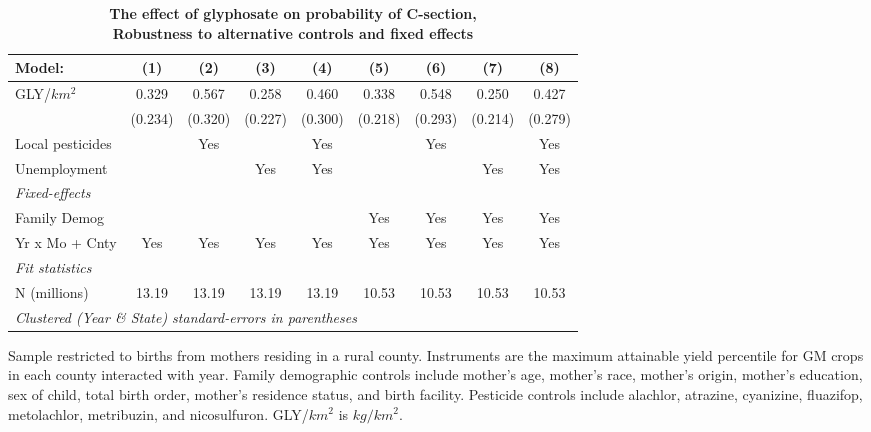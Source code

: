 \begin{table}[htbp]
   \centering
   \small
   \begin{threeparttable}[b]
      \caption{\label{tab:robust-cntrl-c_section-allyielddiffpercentilegmomax} \textbf{The effect of glyphosate on probability of C-section, \\ Robustness to alternative controls and fixed effects}}
      \begin{tabular}{lcccccccc}
         \toprule
         Model:           & (1)     & (2)     & (3)     & (4)     & (5)     & (6)     & (7)     & (8)\\  
         \midrule 
         GLY/$km^2$       & 0.329   & 0.567   & 0.258   & 0.460   & 0.338   & 0.548   & 0.250   & 0.427\\   
                          & (0.234) & (0.320) & (0.227) & (0.300) & (0.218) & (0.293) & (0.214) & (0.279)\\   
         Local pesticides &         & Yes     &         & Yes     &         & Yes     &         & Yes\\  
         Unemployment     &         &         & Yes     & Yes     &         &         & Yes     & Yes\\  
         \midrule
         \emph{Fixed-effects}\\
         Family Demog     &         &         &         &         & Yes     & Yes     & Yes     & Yes\\  
         Yr x Mo + Cnty   & Yes     & Yes     & Yes     & Yes     & Yes     & Yes     & Yes     & Yes\\  
         \midrule
         \emph{Fit statistics}\\
         N (millions)     & 13.19   & 13.19   & 13.19   & 13.19   & 10.53   & 10.53   & 10.53   & 10.53\\  
         \midrule
         \multicolumn{9}{l}{\emph{Clustered (Year \& State) standard-errors in parentheses}}\\
      \end{tabular}
      
      \begin{tablenotes}\item Sample restricted to births from mothers residing in a rural county. Instruments are the maximum attainable yield percentile for GM crops in each county interacted with year. Family demographic controls include mother's age, mother's race, mother's origin, mother's education, sex of child, total birth order, mother's residence status, and birth facility. Pesticide controls include alachlor, atrazine, cyanizine, fluazifop, metolachlor, metribuzin, and nicosulfuron. GLY/$km^2$ is $kg/km^2$.
      \end{tablenotes}
   \end{threeparttable}
\end{table}
